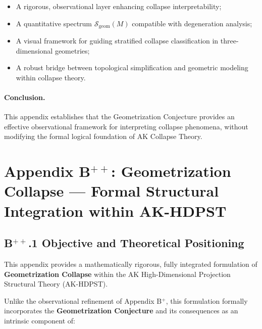 \documentclass[11pt]{article}
\begin{document}
\begin{itemize}
    \item A rigorous, observational layer enhancing collapse interpretability;
    \item A quantitative spectrum $\mathcal{S}_{\mathrm{geom}}(M)$ compatible with degeneration analysis;
    \item A visual framework for guiding stratified collapse classification in three-dimensional geometries;
    \item A robust bridge between topological simplification and geometric modeling within collapse theory.
\end{itemize}

\paragraph{Conclusion.}  
This appendix establishes that the Geometrization Conjecture provides an effective observational framework for interpreting collapse phenomena, without modifying the formal logical foundation of AK Collapse Theory.




\section*{Appendix B$^{++}$: Geometrization Collapse — Formal Structural Integration within AK-HDPST}

\subsection*{B$^{++}$.1 Objective and Theoretical Positioning}

This appendix provides a mathematically rigorous, fully integrated formulation of \textbf{Geometrization Collapse} within the AK High-Dimensional Projection Structural Theory (AK-HDPST).

Unlike the observational refinement of Appendix B$^{+}$, this formulation formally incorporates the \textbf{Geometrization Conjecture} and its consequences as an intrinsic component of:
\end{document}
